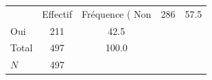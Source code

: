 {
\def\sym#1{\ifmmode^{#1}\else\(^{#1}\)\fi}
\begin{tabular}{l*{1}{cc}}
\toprule
            &    Effectif&Fréquence (%
\midrule
Non         &         286&        57.5\\
Oui         &         211&        42.5\\
Total       &         497&       100.0\\
\midrule
\(N\)       &         497&            \\
\bottomrule
\end{tabular}
}
